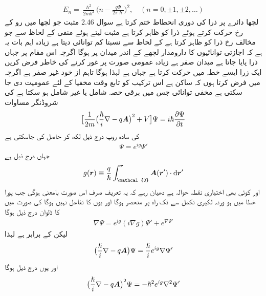 \begin{align} 
E_n = \frac{\hslash^2}{2m b^2} \big ( n - \frac{q \Phi}{2 \pi \hslash} \big )^2, \quad (n = 0, \pm 1, \pm 2, \dotsc)
\end{align}
لچها دائرے پر ذرا کی دوری انحطاط ختم کرتا ہے سوال 2.46 مثبت  جو لچھا میں رو کے رخ حرکت کرتے ہوئے ذرا کو ظاہر کرتا ہے  مثبت لیتے ہوئے منفی  کے لحاظ سے جو مخالف رخ ذرا کو ظاہر کرتا ہے کے لحاظ سے نسبتا کم توانائی دیتا ہے زیادہ اہم بات یہ ہے کہ اجازتی توانائیوں کا دارومدار لچھے کے اندر میدان پر ہوگا اگرچہ اس مقام پر جہاں ذرا پایا جاتا ہے میدان صفر ہے زیادہ عمومی صورت پر غور کرنے کی خاطر فرض کریں ایک زرا ایسے خطہ میں حرکت کرتا ہے جہاں  ہے لہذا  ہوگا تاہم  از خود غیر صفر ہے اگرچہ میں فرض کرتا ہوں کہ  ساکن ہے اس ترکیب کو تابع وقت مخفیا کے لئے عمومیت دی جا سکتی ہے مخفی توانائی  جس میں برقی حصہ  شامل یا غیر شامل ہو سکتا ہے کی شروڈنگر مساوات 
\begin{align} 
\big [ \frac{1}{2m} \big ( \frac{\hslash}{i} \nabla - q {{\boldsymbol{A}}} \big )^2 + V \big ] \Psi = i \hslash \frac{\partial \Psi}{\partial t}
\end{align}
کی سادہ روپ درج ذیل لکھ کر حاصل کی جاسکتی ہے 
\begin{align}
\Psi = e^{i g} \Psi'
\end{align}
جہاں  درج ذیل ہے 
\begin{align}
g (\kvec{r}) \equiv \frac{q}{\hslash} \int_{\mathcal{0}}^{\kvec{r}} \kvec{A} (\kvec{r}') \cdot \dif \kvec{r}'
\end{align}
اور  کوئی بھی اختیاری نقطہ حوالہ ہے دھیان رہے کہ یہ تعریف صرف اس صورت بامعنی ہوگی جب پورا خطا میں  ہو ورنہ لکیری تکمل  سے  تک راہ پر منحصر ہوگا اور یوں  کا تفاعل نہیں ہوگا  کی صورت میں  کا ڈلوان درج ذیل ہوگا 
\begin{align*}
\nabla \Psi = e^{i g} (i \nabla g) \Psi' + e^{\nabla \Psi'}
\end{align*}
لیکن  کے برابر ہے لہذا 
\begin{align}
\big ( \frac{\hslash}{i} \nabla - q {{\boldsymbol{A}}} \big ) \Psi = \frac{\hslash}{i} e^{i g} \nabla \Psi'
\end{align}
اور یوں درج ذیل ہوگا 
\begin{align}
\big ( \frac{\hslash}{i} \nabla - q {{\boldsymbol{A}}} \big )^2 \Psi = - \hslash^2 e^{i g} \nabla^2 \Psi'
\end{align}
